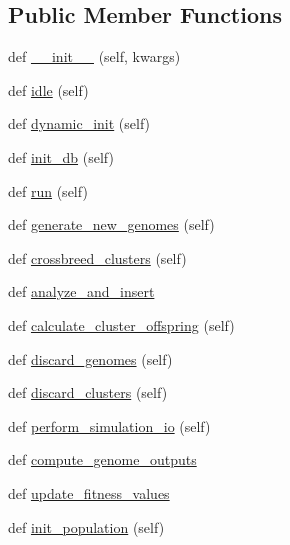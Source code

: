 \subsection*{Public Member Functions}
\begin{DoxyCompactItemize}
\item 
def \hyperlink{classNEAT__PyGenetics_1_1NEAT_1_1Director_1_1MainDirector_1_1MainDirector_ab14b0501fc1b74c88b2e57f2c427f556}{\+\_\+\+\_\+init\+\_\+\+\_\+} (self, kwargs)
\item 
def \hyperlink{classNEAT__PyGenetics_1_1NEAT_1_1Director_1_1MainDirector_1_1MainDirector_ae092b13a0703771ac0813e67fb872362}{idle} (self)
\item 
def \hyperlink{classNEAT__PyGenetics_1_1NEAT_1_1Director_1_1MainDirector_1_1MainDirector_a145a35253c447b14b3a834cd6bbd6b15}{dynamic\+\_\+init} (self)
\item 
def \hyperlink{classNEAT__PyGenetics_1_1NEAT_1_1Director_1_1MainDirector_1_1MainDirector_a1d54dab714e07b9ba097b118994bc7e0}{init\+\_\+db} (self)
\item 
def \hyperlink{classNEAT__PyGenetics_1_1NEAT_1_1Director_1_1MainDirector_1_1MainDirector_a0dc96b0a3075b0522e9179e154e3bfdc}{run} (self)
\item 
def \hyperlink{classNEAT__PyGenetics_1_1NEAT_1_1Director_1_1MainDirector_1_1MainDirector_a62d21475b9a55ebf26b731e1af031998}{generate\+\_\+new\+\_\+genomes} (self)
\item 
def \hyperlink{classNEAT__PyGenetics_1_1NEAT_1_1Director_1_1MainDirector_1_1MainDirector_a24b32672d44473d0ed697d72326a3ed0}{crossbreed\+\_\+clusters} (self)
\item 
def \hyperlink{classNEAT__PyGenetics_1_1NEAT_1_1Director_1_1MainDirector_1_1MainDirector_af9ec8145b3a3dc21f823d38b3ea08df1}{analyze\+\_\+and\+\_\+insert}
\item 
def \hyperlink{classNEAT__PyGenetics_1_1NEAT_1_1Director_1_1MainDirector_1_1MainDirector_afc0fd1df30dc28284a1c9552b507298e}{calculate\+\_\+cluster\+\_\+offspring} (self)
\item 
def \hyperlink{classNEAT__PyGenetics_1_1NEAT_1_1Director_1_1MainDirector_1_1MainDirector_a477d29aba8bdf6743748389dce049b9a}{discard\+\_\+genomes} (self)
\item 
def \hyperlink{classNEAT__PyGenetics_1_1NEAT_1_1Director_1_1MainDirector_1_1MainDirector_a2916d65736e93f21a9a2a8f31d234615}{discard\+\_\+clusters} (self)
\item 
def \hyperlink{classNEAT__PyGenetics_1_1NEAT_1_1Director_1_1MainDirector_1_1MainDirector_a233974c8f6d855886617f80737fb44eb}{perform\+\_\+simulation\+\_\+io} (self)
\item 
def \hyperlink{classNEAT__PyGenetics_1_1NEAT_1_1Director_1_1MainDirector_1_1MainDirector_a37de122cc8ac060871f2af4da1a0a1c1}{compute\+\_\+genome\+\_\+outputs}
\item 
def \hyperlink{classNEAT__PyGenetics_1_1NEAT_1_1Director_1_1MainDirector_1_1MainDirector_ab2602e228a2b8c979d4634ec21b542a8}{update\+\_\+fitness\+\_\+values}
\item 
def \hyperlink{classNEAT__PyGenetics_1_1NEAT_1_1Director_1_1MainDirector_1_1MainDirector_af3c8f23fba40f82bfa1a7d0b504bb218}{init\+\_\+population} (self)
\end{DoxyCompactItemize}
